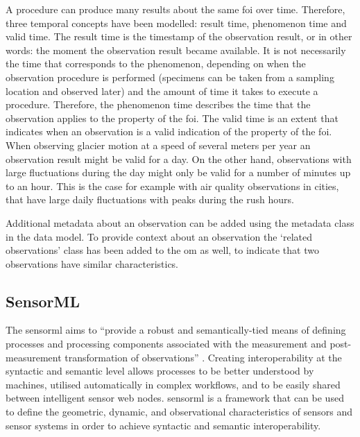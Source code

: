 A procedure can produce many results about the same \ac{foi} over time. Therefore, three temporal concepts have been modelled: result time, phenomenon time and valid time. The result time is the timestamp of the observation result, or in other words: the moment the observation result became available. It is not necessarily the time that corresponds to the phenomenon, depending on when the observation procedure is performed (specimens can be taken from a sampling location and observed later) and the amount of time it takes to execute a procedure. Therefore, the phenomenon time describes the time that the observation applies to the property of the \ac{foi}. The valid time is an extent that indicates when an observation is a valid indication of the property of the \ac{foi}. When observing glacier motion at a speed of several  meters per year an observation result might be valid for a day. On the other hand, observations with large fluctuations during the day might only be valid for a number of minutes up to an hour. This is the case for example with air quality observations in cities, that have large daily fluctuations with peaks during the rush hours.     

Additional metadata about an observation can be added using the metadata class in the data model. To provide context about an observation the `related observations' class has been added to the \ac{om}  as well, to indicate that two observations have similar characteristics.

\subsection{SensorML}
\label{par:sensorml}

The \acf{sensorml} aims to \enquote{provide a robust and semantically-tied means of defining processes and processing components associated with the measurement and post-measurement transformation of observations} \citep[p. ix]{SW:OGC7}. Creating interoperability at the syntactic and semantic level allows processes to be better understood by machines, utilised automatically in complex workflows, and to be easily shared between intelligent sensor web nodes. \ac{sensorml} is a framework that can be used to define the geometric, dynamic, and observational characteristics of sensors and sensor systems in order to achieve syntactic and semantic interoperability. 

